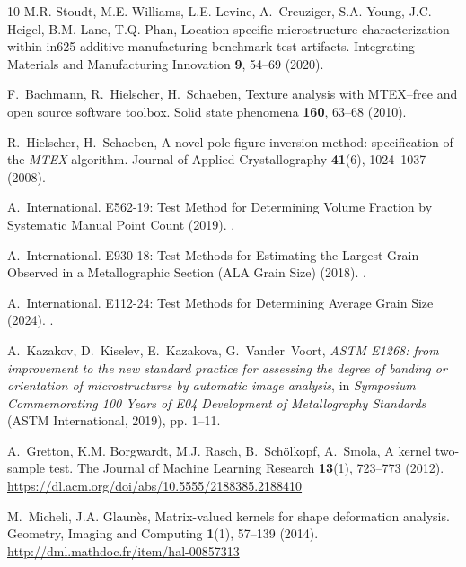 \documentclass[pdflatex,iicol]{sn-jnl}%
\theoremstyle{thmstyleone}%
\theoremstyle{thmstyletwo}%
\theoremstyle{thmstylethree}%
\begin{document}
\begin{thebibliography}{10}
M.R. Stoudt, M.E. Williams, L.E. Levine, A.~Creuziger, S.A. Young, J.C. Heigel, B.M. Lane, T.Q. Phan, Location-specific microstructure characterization within in625 additive manufacturing benchmark test artifacts.
\newblock Integrating Materials and Manufacturing Innovation \textbf{9}, 54--69 (2020).
\newblock {}

F.~Bachmann, R.~Hielscher, H.~Schaeben, Texture analysis with {MTEX}--free and open source software toolbox.
\newblock Solid state phenomena \textbf{160}, 63--68 (2010).
\newblock {}

R.~Hielscher, H.~Schaeben, {A novel pole figure inversion method: specification of the {\it MTEX} algorithm}.
\newblock Journal of Applied Crystallography \textbf{41}(6), 1024--1037 (2008).
\newblock {}

A.~International.
 {E562}-19: {Test} {Method} for {Determining} {Volume} {Fraction} by {Systematic} {Manual} {Point} {Count} (2019).
\newblock {}.

A.~International.
 {E930}-18: {Test} {Methods} for {Estimating} the {Largest} {Grain} {Observed} in a {Metallographic} {Section} ({ALA} {Grain} {Size}) (2018).
\newblock {}.

A.~International.
 {E112}-24: {Test} {Methods} for {Determining} {Average} {Grain} {Size} (2024).
\newblock {}.

A.~Kazakov, D.~Kiselev, E.~Kazakova, G.~Vander~Voort, \emph{{ASTM E1268}: from improvement to the new standard practice for assessing the degree of banding or orientation of microstructures by automatic image analysis}, in \emph{Symposium Commemorating 100 Years of E04 Development of Metallography Standards} (ASTM International, 2019), pp. 1--11.
\newblock {}

A.~Gretton, K.M. Borgwardt, M.J. Rasch, B.~Sch{\"o}lkopf, A.~Smola, A kernel two-sample test.
\newblock The Journal of Machine Learning Research \textbf{13}(1), 723--773 (2012).
\newblock \urlprefix\url{https://dl.acm.org/doi/abs/10.5555/2188385.2188410}

M.~Micheli, J.A. Glaun{\`e}s, Matrix-valued kernels for shape deformation analysis.
\newblock Geometry, Imaging and Computing \textbf{1}(1), 57--139 (2014).
\newblock \urlprefix\url{http://dml.mathdoc.fr/item/hal-00857313}


\end{thebibliography}
\end{document}
